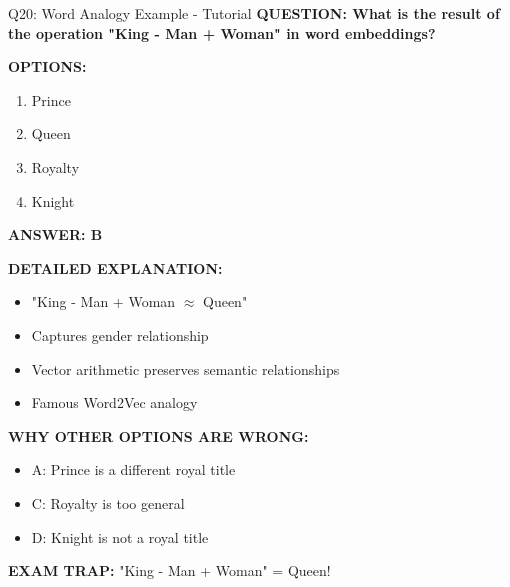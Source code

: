 \documentclass[8pt]{beamer}
\begin{document}
	\begin{frame}{Q20: Word Analogy Example - Tutorial}
		\fontsize{6.5}{7.5}\selectfont
		\textbf{QUESTION: What is the result of the operation "King - Man + Woman" in word embeddings?}
		
		\vspace{0.1cm}
		\textbf{OPTIONS:}
		\begin{enumerate}
			\item Prince
			\item Queen
			\item Royalty
			\item Knight
		\end{enumerate}
		
		\vspace{0.1cm}
		\textcolor{myblue}{\textbf{ANSWER: B}}
		
		\vspace{0.1cm}
		\textbf{DETAILED EXPLANATION:}
		\begin{itemize}
			\item "King - Man + Woman $\approx$ Queen"
			\item Captures gender relationship
			\item Vector arithmetic preserves semantic relationships
			\item Famous Word2Vec analogy
		\end{itemize}
		
		\vspace{0.1cm}
		\textcolor{myred}{\textbf{WHY OTHER OPTIONS ARE WRONG:}}
		\begin{itemize}
			\item \textcolor{myred}{A:} Prince is a different royal title
			\item \textcolor{myred}{C:} Royalty is too general
			\item \textcolor{myred}{D:} Knight is not a royal title
		\end{itemize}
		
		\textcolor{myred}{\textbf{EXAM TRAP:}} "King - Man + Woman" = \textcolor{myblue}{Queen}!
	\end{frame}
	
\end{document}
